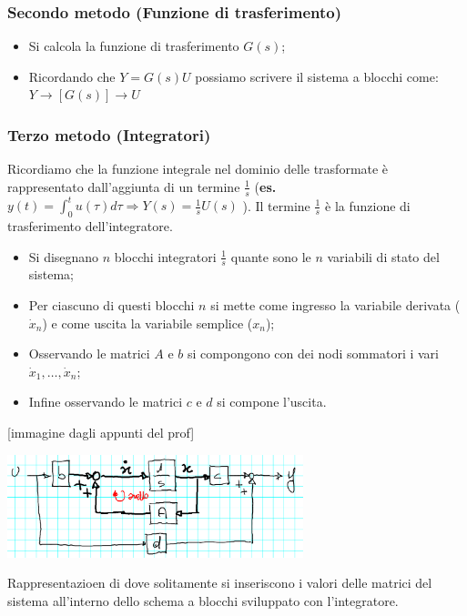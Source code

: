 \subsubsection{Secondo metodo (Funzione di trasferimento)}
\begin{itemize}
    \item Si calcola la funzione di trasferimento $G(s)$;
    \item Ricordando che $Y = G(s) U$ possiamo scrivere il sistema a blocchi come: $Y \longrightarrow \left[G(s)\right] \longrightarrow U$
\end{itemize}
\subsubsection{Terzo metodo (Integratori)}
Ricordiamo che la funzione integrale nel dominio delle trasformate è rappresentato dall'aggiunta di un termine $\frac{1}{s}$ (\textbf{es.} $y(t) = \int_{0}^{t}u(\tau)d \tau \Rightarrow Y(s) = \frac{1}{s} U(s)$ ).\newline
Il termine $\frac{1}{s}$ è la funzione di trasferimento dell'integratore.
\begin{itemize}
    \item Si disegnano $n$ blocchi integratori $\frac{1}{s}$ quante sono le $n$ variabili di stato del sistema;
    \item Per ciascuno di questi blocchi $n$ si mette come ingresso la variabile derivata ($\dot{x}_n$) e come uscita la variabile semplice ($x_n$);
    \item Osservando le matrici $A$ e $b$ si compongono con dei nodi sommatori i vari $\dot{x}_1, \dots, \dot{x}_n$;
    \item Infine osservando le matrici $c$ e $d$ si compone l'uscita.
\end{itemize}
[immagine dagli appunti del prof]
\begin{center}
    \includegraphics[height=3cm]{../lezione8/img1.PNG}
\end{center}
Rappresentazioen di dove solitamente si inseriscono i valori delle matrici del sistema all'interno dello schema a blocchi sviluppato con l'integratore.
